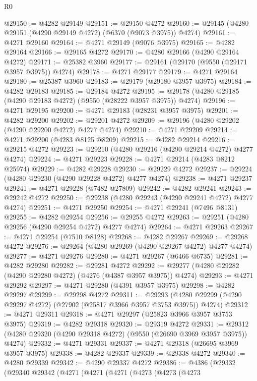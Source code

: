 \begin{lexlean}{R0}
\begin{coremodule}
@29150 := @4282 @29149
@29151 := @29150 @4272
@29160 := @29145 (@4280 @29151 (@4290 @29149 @4272) (@6370 (@9073 @3975)) @4274)
@29161 := @4271 @29160
@29164 := @4271 @29149 (@9076 @3975)
@29165 := @4282 @29164
@29166 := @29165 @4272
@29170 := @4280 @29166 (@4290 @29164 @4272)
@29171 := @25382 @3960
@29177 := @29161 (@29170 (@9550 (@29171 @3957 @3975)) @4274)
@29178 := @4271 @29177
@29179 := @4271 @29164
@29180 := @25387 @3960
@29183 := @29179 (@29180 @3957 @3975)
@29184 := @4282 @29183
@29185 := @29184 @4272
@29195 := @29178 (@4280 @29185 (@4290 @29183 @4272) (@9550 (@28222 @3957 @3975)) @4274)
@29196 := @4271 @29195
@29200 := @4271 @29183 (@28231 @3957 @3975)
@29201 := @4282 @29200
@29202 := @29201 @4272
@29209 := @29196 (@4280 @29202 (@4290 @29200 @4272) @4277 @4274)
@29210 := @4271 @29209
@29214 := @4271 @29200 (@4283 @8125 @8209)
@29215 := @4282 @29214
@29216 := @29215 @4272
@29223 := @29210 (@4280 @29216 (@4290 @29214 @4272) @4277 @4274)
@29224 := @4271 @29223
@29228 := @4271 @29214 (@4283 @8212 @25974)
@29229 := @4282 @29228
@29230 := @29229 @4272
@29237 := @29224 (@4280 @29230 (@4290 @29228 @4272) @4277 @4274)
@29238 := @4271 @29237
@29241 := @4271 @29228 (@7482 @27809)
@29242 := @4282 @29241
@29243 := @29242 @4272
@29250 := @29238 (@4280 @29243 (@4290 @29241 @4272) @4277 @4274)
@29251 := @4271 @29250
@29254 := @4271 @29241 (@7496 @8131)
@29255 := @4282 @29254
@29256 := @29255 @4272
@29263 := @29251 (@4280 @29256 (@4290 @29254 @4272) @4277 @4274)
@29264 := @4271 @29263
@29267 := @4271 @29254 (@7510 @8128)
@29268 := @4282 @29267
@29269 := @29268 @4272
@29276 := @29264 (@4280 @29269 (@4290 @29267 @4272) @4277 @4274)
@29277 := @4271 @29276
@29280 := @4271 @29267 (@6466 @6735)
@29281 := @4282 @29280
@29282 := @29281 @4272
@29292 := @29277 (@4280 @29282 (@4290 @29280 @4272) (@4276 (@4387 @3957 @3975)) @4274)
@29293 := @4271 @29292
@29297 := @4271 @29280 (@4391 @3957 @3975)
@29298 := @4282 @29297
@29299 := @29298 @4272
@29311 := @29293 (@4280 @29299 (@4290 @29297 @4272) (@27902 (@25817 @3966 @3957 @3753 @3975)) @4274)
@29312 := @4271 @29311
@29318 := @4271 @29297 (@25823 @3966 @3957 @3753 @3975)
@29319 := @4282 @29318
@29320 := @29319 @4272
@29331 := @29312 (@4280 @29320 (@4290 @29318 @4272) (@9550 (@26690 @3969 @3957 @3975)) @4274)
@29332 := @4271 @29331
@29337 := @4271 @29318 (@26695 @3969 @3957 @3975)
@29338 := @4282 @29337
@29339 := @29338 @4272
@29340 := @4280 @29339
@29342 := @4290 @29337 @4272
@29386 := @4386
    (@29332
      (@29340
        @29342
        (@4271
          (@4271
            (@4271
              (@4273
                (@4273
                  (@4273

\end{coremodule}
\end{lexlean}
